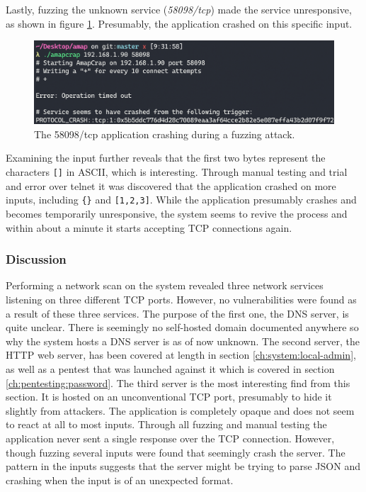 Lastly, fuzzing the unknown service (\textit{58098/tcp}) made the service unresponsive, as shown in figure \ref{fig:amapcrap-fuzz-attack}. Presumably, the application crashed on this specific input.
\begin{figure}[!ht]
    \centering
    \includegraphics[width=\textwidth]{images/6-pentesting/amapcrap-fuzz-crash.png}
    \caption{The 58098/tcp application crashing during a fuzzing attack.}
    \label{fig:amapcrap-fuzz-attack}
\end{figure}
Examining the input further reveals that the first two bytes represent the characters \texttt{[]} in ASCII, which is interesting. Through manual testing and trial and error over telnet it was discovered that the application crashed on more inputs, including \texttt{\{\}} and \texttt{[1,2,3]}. While the application presumably crashes and becomes temporarily unresponsive, the system seems to revive the process and within about a minute it starts accepting TCP connections again.

\subsubsection{Discussion}
Performing a network scan on the system revealed three network services listening on three different TCP ports. However, no vulnerabilities were found as a result of these three services. The purpose of the first one, the DNS server, is quite unclear. There is seemingly no self-hosted domain documented anywhere so why the system hosts a DNS server is as of now unknown. The second server, the HTTP web server, has been covered at length in section \ref{ch:system:local-admin}, as well as a pentest that was launched against it which is covered in section \ref{ch:pentesting:password}. The third server is the most interesting find from this section. It is hosted on an unconventional TCP port, presumably to hide it slightly from attackers. The application is completely opaque and does not seem to react at all to most inputs. Through all fuzzing and manual testing the application never sent a single response over the TCP connection. However, though fuzzing several inputs were found that seemingly crash the server. The pattern in the inputs suggests that the server might be trying to parse JSON and crashing when the input is of an unexpected format.

